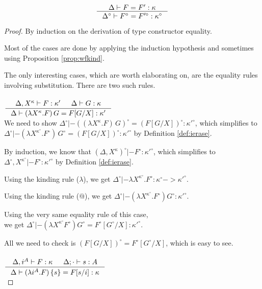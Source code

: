 \begin{theorem}
\[ \inference{\Delta |- F=F':\kappa}
		{\Delta^\circ |- F^\circ=F'^\circ:\kappa^\circ}
\]
\label{thm:ierasetyconeq}
\end{theorem}
\begin{proof}
By induction on the derivation of type constructor equality.

Most of the cases are done by applying the induction hypothesis
and sometimes using Proposition \ref{prop:wfkind}.

The only interesting cases, which are worth elaborating on, are the
equality rules involving substitution.  There are two such rules.

\paragraph{}
  $\inference{\Delta,X^\kappa |- F:\kappa' & \Delta |- G:\kappa}
             {\Delta |- (\lambda X^\kappa.F)\,G = F[G/X]:\kappa'}$ \\

We need to show
$ \Delta^\circ |- ((\lambda X^\kappa.F)\,G)^\circ = (F[G/X])^\circ : \kappa'^\circ $,
which simplifies to 
$ \Delta^\circ |- (\lambda X^{\kappa^\circ}.F^\circ)\,G^\circ = (F[G/X])^\circ : \kappa'^\circ $
by Definition \ref{def:ierase}.

By induction, we know that $(\Delta,X^\kappa)^\circ |- F^\circ : \kappa'^\circ$,
which simplifies to $\Delta^\circ,X^{\kappa^\circ} |- F^\circ : \kappa'^\circ$
by Definition \ref{def:ierase}.

Using the kinding rule ($\lambda$), we get
$\Delta^\circ |- \lambda X^{\kappa^\circ}. F^\circ : \kappa^\circ -> \kappa'^\circ$.

Using the kinding rule ($@$), we get
$\Delta^\circ |- (\lambda X^{\kappa^\circ}. F^\circ) G^\circ : \kappa'^\circ$.

Using the very same equality rule of this case,\\ we get 
$\Delta^\circ |- (\lambda X^{\kappa^\circ} F^\circ) G^\circ =
F^\circ[G^\circ/X] : \kappa'^\circ$.

All we need to check is $(F[G/X])^\circ = F^\circ[G^\circ/X]$,
which is easy to see.

\paragraph{}
  $\inference{\Delta,i^A |- F:\kappa & \Delta;\cdot |- s:A}
             {\Delta |- (\lambda i^A.F)\,\{s\} = F[s/i]:\kappa}$ \\


\end{proof}
